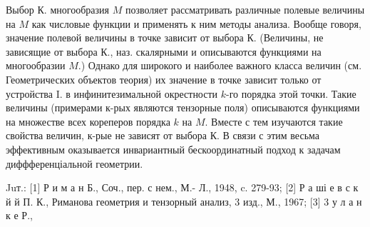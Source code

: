 \documentclass[10pt]{article}
\begin{document}
Выбор К. многообразия $M$ позволяет рассматривать различные полевые величины на $M$ как числовые функции и применять к ним методы анализа. Вообще говоря, значение полевой величины в точке зависит от выбора К. (Величины, не зависящие от выбора К., наз. скалярными и описываются функциями на многообразии $M$.) Однако для широкого и наиболее важного класса величин (см. Геометрических объектов теория) их значение в точке зависит только от устройства I. в инфинитезимальной окрестности $k$-го порядка этой точки. Такие величины (примерами к-рых являются тензорные поля) описываются функциями на множестве всех кореперов порядка $k$ на $M$. Вместе с тем изучаются такие свойства величин, к-рые не зависят от выбора К. В связи с этим весьма эффективным оказывается инвариантный бескоординатный подход к задачам диффференціальной геометрии.



Juт.: [1] Р и м а н Б., Соч., пер. с нем., М.- Л., 1948, c. 279-93; [2] Р а ші е в с к й й П. К., Риманова геометрия и тензорный анализ, 3 изд., М., 1967; [3] 3 у л а н к е Р.,
\end{document}
